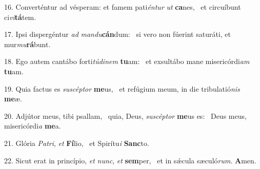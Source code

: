 16. Converténtur ad vésperam: et famem pati\textit{én}\textit{tur} \textit{ut} \textbf{ca}nes, \ast\  et circuíbunt ci\textit{vi}\textbf{tá}tem.\

17. Ipsi dispergéntur \textit{ad} \textit{man}\textit{du}\textbf{cán}dum: \ast\  si vero non fúerint saturáti, et mur\textit{mu}\textbf{rá}bunt.\

18. Ego autem cantábo forti\textit{tú}\textit{di}\textit{nem} \textbf{tu}am: \ast\  et exsultábo mane misericórdi\textit{am} \textbf{tu}am.\

19. Quia factus es \textit{su}\textit{scép}\textit{tor} \textbf{me}us, \ast\  et refúgium meum, in die tribulatió\textit{nis} \textbf{me}æ.\

20. Adjútor meus, tibi psallam, \dag\  quia, Deus, \textit{su}\textit{scép}\textit{tor} \textbf{me}us es: \ast\  Deus meus, misericórdi\textit{a} \textbf{me}a.\

21. Glória \textit{Pa}\textit{tri}, \textit{et} \textbf{Fí}lio, \ast\  et Spirítu\textit{i} \textbf{Sanc}to.\

22. Sicut erat in princípio, \textit{et} \textit{nunc}, \textit{et} \textbf{sem}per, \ast\  et in sǽcula sæculó\textit{rum}. \textbf{A}men.\

